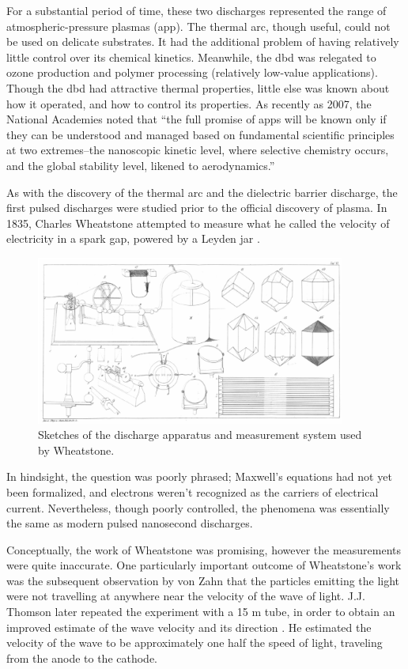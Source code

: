 For a substantial period of time, these two discharges represented the range of
atmospheric-pressure plasmas (\acs{app}). The thermal arc, though useful, could
not be used on delicate substrates. It had the additional problem of having
relatively little control over its chemical kinetics. Meanwhile, the \acs{dbd}
was relegated to ozone production and polymer processing (relatively low-value
applications). Though the \acs{dbd} had attractive thermal properties, little
else was known about how it operated, and how to control its properties. As
recently as 2007, the National Academies noted that ``the full promise of
\acs{app}s will be known only if they can be understood and managed based on
fundamental scientific principles at two extremes--the nanoscopic kinetic level,
where selective chemistry occurs, and the global stability level, likened to
aerodynamics.'' \cite{NA2007}

As with the discovery of the thermal arc and the dielectric barrier discharge,
the first pulsed discharges were studied prior to the official discovery of
plasma. In 1835, Charles Wheatstone attempted to measure what he called the
velocity of electricity in a spark gap, powered by a Leyden jar
\cite{Wheatstone1835}.
\begin{figure}
  \centering
  \includegraphics[width=4in]{chapters/introduction/figures/wheatstone.png}
  \caption{Sketches of the discharge apparatus and measurement system used by
Wheatstone.}
\end{figure}
In hindsight, the question was poorly phrased; Maxwell's
equations had not yet been formalized, and electrons weren't recognized as the
carriers of electrical current. Nevertheless, though poorly controlled, the
phenomena was essentially the same as modern pulsed nanosecond discharges.

Conceptually, the work of Wheatstone was promising, however the measurements
were quite inaccurate. One particularly important outcome of Wheatstone's work
was the subsequent observation by von Zahn \cite{Zahn1879} that the particles
emitting the light were not travelling at anywhere near the velocity of the wave
of light. J.J. Thomson later repeated the experiment with a 15 m tube, in order
to obtain an improved estimate of the wave velocity and its direction
\cite{Thomson1893}. He estimated the velocity of the wave to be approximately
one half the speed of light, traveling from the anode to the cathode.

